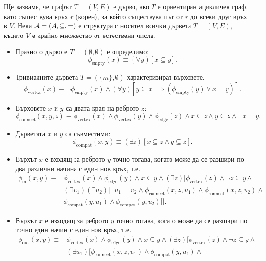 \begin{problem}
  Ще казваме, че графът $T = (V,E)$ е дърво, ако $T$ е ориентиран ацикличен граф, като съществува връх $r$ (корен), за който
  съществува път от $r$ до всеки друг връх в $V$.
  Нека $\mathcal{A} = (A,\subseteq,=)$ е структура с носител всички дървета $T = (V,E)$, където $V$ е крайно множество от естествени числа.
  \begin{itemize}
  \item
    Празното дърво е $T = (\emptyset,\emptyset)$ е определимо:
    \[\phi_{\text{empty}}(x) \equiv (\forall y)[x \subseteq y].\]
  \item
    Тривиалните дървета $T = (\{m\},\emptyset)$ характеризират върховете. 
    \[\phi_{\text{vertex}}(x) \equiv \neg \phi_{\text{empty}}(x) \land (\forall y)[y \subseteq x \implies (\phi_{\text{empty}}(y) \lor x = y)].\]
  \item
    Върховете $x$ и $y$ са двата края на реброто $z$:
    \[\phi_{\text{connect}}(x,y,z) \equiv \phi_{\text{vertex}}(x) \land \phi_{\text{vertex}}(y) \land \phi_{\text{edge}}(z) \land x \subseteq z \land y \subseteq z \land \neg x = y.\]
  \item
    Дърветата $x$ и $y$ са съвместими: 
    \[\phi_{\text{compat}}(x,y) \equiv (\exists z)[x \subseteq z \land y \subseteq z].\]
  \item
    Върхът $x$ е входящ за реброто $y$ точно тогава, когато може да се разшири по два различни начина с един нов връх, т.е.
    \begin{align*}
      \phi_{\text{in}}(x,y) \equiv & \phi_{\text{vertex}}(x) \land \phi_{\text{edge}}(y) \land x \subseteq y \land (\exists z)[\phi_{\text{vertex}}(z) \land \neg z \subseteq y \land \\
                                & (\exists u_1)(\exists u_2)[\neg u_1 = u_2 \land \phi_{\text{connect}}(x,z,u_1) \land \phi_{\text{connect}}(x,z,u_2) \land \\
                                & \phi_{\text{compat}}(y,u_1) \land \phi_{\text{compat}}(y,u_2)]].
    \end{align*}
  \item
    Върхът $x$ е изходящ за реброто $y$ точно тогава, когато може да се разшири по точно един начин с един нов връх, т.е.
    \begin{align*}
      \phi_{\text{out}}(x,y) \equiv & \phi_{\text{vertex}}(x) \land \phi_{\text{edge}}(y) \land x \subseteq y \land (\exists z)[\phi_{\text{vertex}}(z) \land \neg z \subseteq y \land \\
                                 & (\exists u_1)[\phi_{\text{connect}}(x,z,u_1) \land \phi_{\text{compat}}(y,u_1) \land \\

\end{align*}
\end{itemize}
\end{problem}
